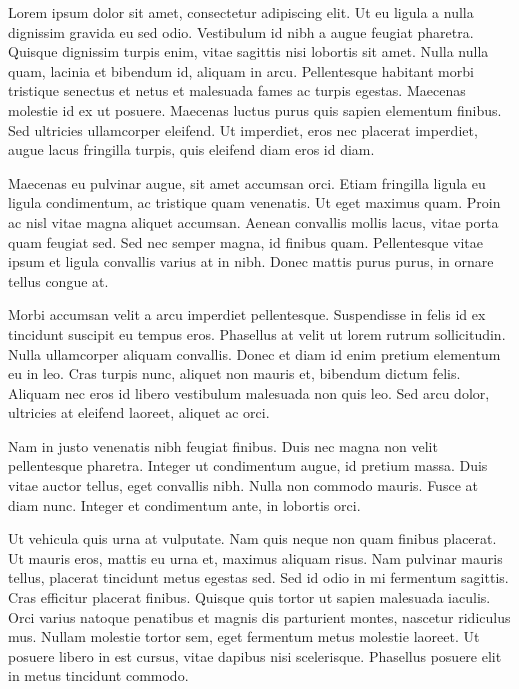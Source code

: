 \documentclass[../main.tex]{subfiles}
\begin{document}
\label{capitolo5}
\thispagestyle{empty}

Lorem ipsum dolor sit amet, consectetur adipiscing elit. Ut eu ligula a nulla dignissim gravida eu sed odio. Vestibulum id nibh a augue feugiat pharetra. Quisque dignissim turpis enim, vitae sagittis nisi lobortis sit amet. Nulla nulla quam, lacinia et bibendum id, aliquam in arcu. Pellentesque habitant morbi tristique senectus et netus et malesuada fames ac turpis egestas. Maecenas molestie id ex ut posuere. Maecenas luctus purus quis sapien elementum finibus. Sed ultricies ullamcorper eleifend. Ut imperdiet, eros nec placerat imperdiet, augue lacus fringilla turpis, quis eleifend diam eros id diam.

Maecenas eu pulvinar augue, sit amet accumsan orci. Etiam fringilla ligula eu ligula condimentum, ac tristique quam venenatis. Ut eget maximus quam. Proin ac nisl vitae magna aliquet accumsan. Aenean convallis mollis lacus, vitae porta quam feugiat sed. Sed nec semper magna, id finibus quam. Pellentesque vitae ipsum et ligula convallis varius at in nibh. Donec mattis purus purus, in ornare tellus congue at.

Morbi accumsan velit a arcu imperdiet pellentesque. Suspendisse in felis id ex tincidunt suscipit eu tempus eros. Phasellus at velit ut lorem rutrum sollicitudin. Nulla ullamcorper aliquam convallis. Donec et diam id enim pretium elementum eu in leo. Cras turpis nunc, aliquet non mauris et, bibendum dictum felis. Aliquam nec eros id libero vestibulum malesuada non quis leo. Sed arcu dolor, ultricies at eleifend laoreet, aliquet ac orci.

Nam in justo venenatis nibh feugiat finibus. Duis nec magna non velit pellentesque pharetra. Integer ut condimentum augue, id pretium massa. Duis vitae auctor tellus, eget convallis nibh. Nulla non commodo mauris. Fusce at diam nunc. Integer et condimentum ante, in lobortis orci.

Ut vehicula quis urna at vulputate. Nam quis neque non quam finibus placerat. Ut mauris eros, mattis eu urna et, maximus aliquam risus. Nam pulvinar mauris tellus, placerat tincidunt metus egestas sed. Sed id odio in mi fermentum sagittis. Cras efficitur placerat finibus. Quisque quis tortor ut sapien malesuada iaculis. Orci varius natoque penatibus et magnis dis parturient montes, nascetur ridiculus mus. Nullam molestie tortor sem, eget fermentum metus molestie laoreet. Ut posuere libero in est cursus, vitae dapibus nisi scelerisque. Phasellus posuere elit in metus tincidunt commodo.
\end{document}
